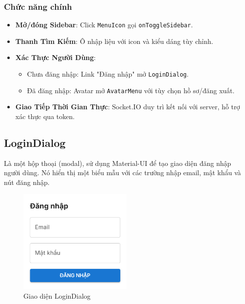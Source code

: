             \subsubsection{Chức năng chính}
                \begin{itemize}
                    \item \textbf{Mở/đóng Sidebar}: Click \texttt{MenuIcon} gọi \texttt{onToggleSidebar}.
                    \item \textbf{Thanh Tìm Kiếm}: Ô nhập liệu với icon và kiểu dáng tùy chỉnh.
                    \item \textbf{Xác Thực Người Dùng}:
                    \begin{itemize}
                        \item Chưa đăng nhập: Link "Đăng nhập" mở \texttt{LoginDialog}.
                        \item Đã đăng nhập: Avatar mở \texttt{AvatarMenu} với tùy chọn hồ sơ/đăng xuất.
                    \end{itemize}
                    \item \textbf{Giao Tiếp Thời Gian Thực}: Socket.IO duy trì kết nối với server, hỗ trợ xác thực qua token.
                \end{itemize}
        \subsection{LoginDialog}
            \hspace*{0.6cm}Là một hộp thoại (modal), sử dụng Material-UI để tạo giao diện đăng nhập người dùng. Nó hiển thị một biểu mẫu với các trường nhập email, mật khẩu và nút đăng nhập.
            \begin{figure}[H]
                \centering
                \includegraphics[width=0.5\textwidth]{pictures/LoginDialog.png}
                \caption{Giao diện LoginDialog}
                \label{fig:login}
            \end{figure}
